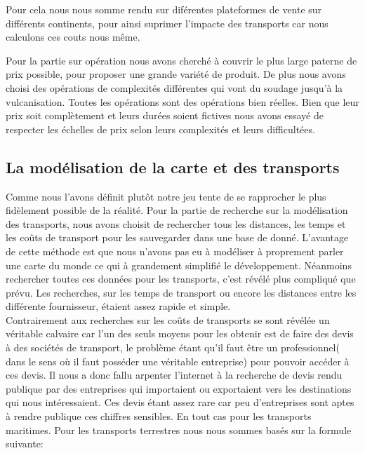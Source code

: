 Pour cela nous nous somme rendu sur diférentes plateformes de vente sur différents continents, pour ainsi suprimer l'impacte des transports car nous calculons ces couts nous même.

Pour la partie sur opération nous avons cherché à couvrir le plus large paterne de prix possible, pour proposer une grande variété de produit. De plus nous avons choisi des opérations de complexités différentes qui vont du soudage jusqu’à la vulcanisation.  Toutes les opérations sont des opérations bien réelles. Bien que leur prix soit complètement et leurs durées soient fictives nous avons essayé de respecter les échelles de prix selon leurs complexités et leurs difficultées.



\subsection{La modélisation de la carte et des transports}



Comme nous l'avons définit plutôt notre jeu tente de se rapprocher le plus fidèlement possible de la réalité. Pour la partie de recherche sur la modélisation des transports, nous avons choisit de rechercher tous les distances, les temps et les coûts de transport pour les sauvegarder dans une base de donné. L’avantage de cette méthode est que nous n’avons pas eu à modéliser à proprement parler une carte du monde ce qui à grandement simplifié le développement. Néanmoins rechercher toutes ces données pour les transports, c’est révélé plus compliqué que prévu. Les recherches, sur les temps de transport ou encore les distances entre les différente fournisseur, étaient assez rapide et simple.
\\

Contrairement aux recherches sur les coûts de transports se sont révélée un véritable calvaire car l’un des seuls moyens pour les obtenir est de faire des devis à des sociétés de transport, le problème étant qu’il faut être un professionnel( dans le sens où il faut posséder une véritable entreprise) pour pouvoir accéder à ces devis. Il nous a donc fallu arpenter l'internet à la recherche de devis rendu publique par des entreprises qui importaient ou exportaient vers les destinations qui nous intéressaient. Ces devis étant assez rare car peu d'entreprises  sont aptes à rendre publique ces chiffres sensibles. En tout cas pour les transports maritimes. Pour les transports terrestres nous nous sommes basés sur la formule suivante:

